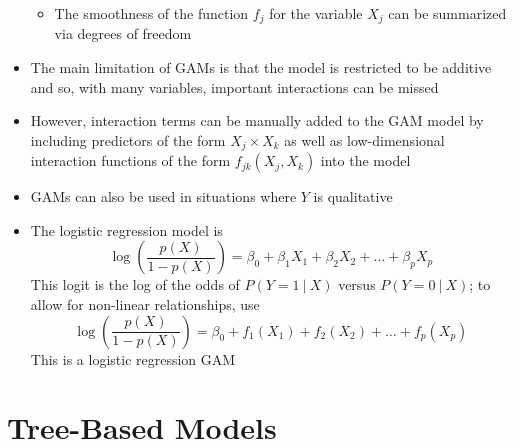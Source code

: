 \documentclass[12pt]{article}
\begin{document}
\begin{itemize}
\begin{itemize}
\item The smoothness of the function $f_j$ for the variable $X_j$ can be summarized via degrees of freedom \end{itemize} 
\item The main limitation of GAMs is that the model is restricted to be additive and so, with many variables, important interactions can be missed 
\item However, interaction terms can be manually added to the GAM model by including predictors of the form $X_j \times X_k$ as well as low-dimensional interaction functions of the form $f_{jk}(X_j,X_k)$ into the model
\item GAMs can also be used in situations where $Y$ is qualitative 
\item The logistic regression model is $$ \log \left( \frac{p(X)}{1-p(X)}\right) = \beta_0 + \beta_1X_1 + \beta_2X_2 + \dots + \beta_pX_p $$ This logit is the log of the odds of $P(Y=1~|~X)$ versus $P(Y=0~|~X)$; to allow for non-linear relationships, use $$ \log\left( \frac{p(X)}{1-p(X)}\right) = \beta_0 + f_1(X_1) + f_2(X_2) + \dots + f_p(X_p) $$ This is a logistic regression GAM
\end{itemize}

\section{Tree-Based Models}
\end{document}
